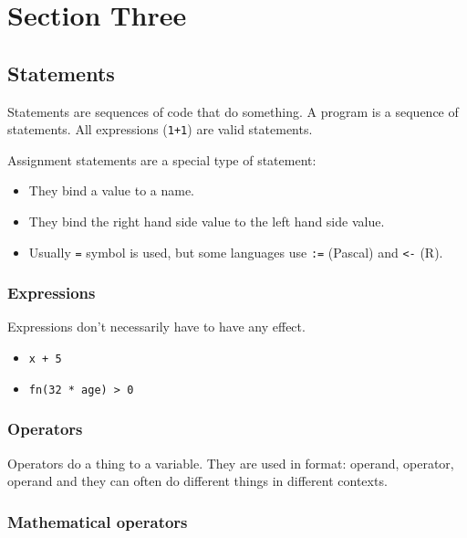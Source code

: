 \section{Section Three}\label{sub:section_three}

\subsection{Statements}\label{ssub:statements}

Statements are sequences of code that do something.
A program is a sequence of statements.
All expressions (\texttt{1+1}) are valid statements.

Assignment statements are a special type of statement:

\begin{itemize}
	\item They bind a value to a name.
	\item They bind the right hand side value to the left hand side value.
	\item Usually \texttt{=} symbol is used, but some languages use \texttt{:=} (Pascal) and \texttt{<-} (R).
\end{itemize}

\subsubsection{Expressions}\label{ssub:expressions}

Expressions don't necessarily have to have any effect.

\begin{itemize}
	\item \texttt{x + 5}
	\item \texttt{fn(32 * age) > 0}
\end{itemize}

\subsubsection{Operators}\label{ssub:operators}

Operators do a thing to a variable.
They are used in format: operand, operator, operand and they can often do different things in different contexts.

\subsubsection{Mathematical operators}\label{ssub:mathematical-operators}

